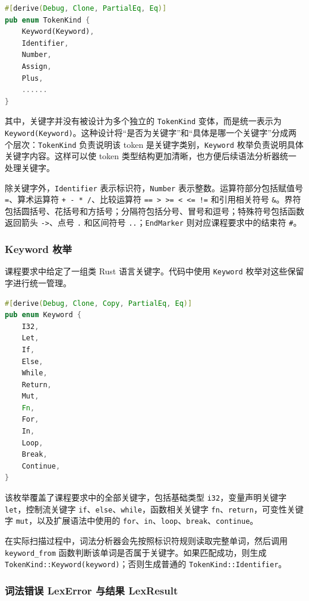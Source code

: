 \documentclass[UTF8,a4paper,12pt]{ctexart}
\begin{document}
\begin{lstlisting}[language=Rust,caption={TokenKind 枚举定义}]
#[derive(Debug, Clone, PartialEq, Eq)]
pub enum TokenKind {
    Keyword(Keyword),
    Identifier,
    Number,
    Assign,
    Plus,
    ......
}
\end{lstlisting}

其中，关键字并没有被设计为多个独立的 \texttt{TokenKind} 变体，而是统一表示为 \texttt{Keyword(Keyword)}。这种设计将“是否为关键字”和“具体是哪一个关键字”分成两个层次：\texttt{TokenKind} 负责说明该 token 是关键字类别，\texttt{Keyword} 枚举负责说明具体关键字内容。这样可以使 token 类型结构更加清晰，也方便后续语法分析器统一处理关键字。

除关键字外，\texttt{Identifier} 表示标识符，\texttt{Number} 表示整数。运算符部分包括赋值号 \texttt{=}、算术运算符 \texttt{+ - * /}、比较运算符 \texttt{== > >= < <= !=} 和引用相关符号 \texttt{\&}。界符包括圆括号、花括号和方括号；分隔符包括分号、冒号和逗号；特殊符号包括函数返回箭头 \texttt{->}、点号 \texttt{.} 和区间符号 \texttt{..}；\texttt{EndMarker} 则对应课程要求中的结束符 \texttt{\#}。

\subsubsection{Keyword 枚举}

课程要求中给定了一组类 Rust 语言关键字。代码中使用 \texttt{Keyword} 枚举对这些保留字进行统一管理。

\begin{lstlisting}[language=Rust,caption={Keyword 枚举定义}]
#[derive(Debug, Clone, Copy, PartialEq, Eq)]
pub enum Keyword {
    I32,
    Let,
    If,
    Else,
    While,
    Return,
    Mut,
    Fn,
    For,
    In,
    Loop,
    Break,
    Continue,
}
\end{lstlisting}

该枚举覆盖了课程要求中的全部关键字，包括基础类型 \texttt{i32}，变量声明关键字 \texttt{let}，控制流关键字 \texttt{if}、\texttt{else}、\texttt{while}，函数相关关键字 \texttt{fn}、\texttt{return}，可变性关键字 \texttt{mut}，以及扩展语法中使用的 \texttt{for}、\texttt{in}、\texttt{loop}、\texttt{break}、\texttt{continue}。

在实际扫描过程中，词法分析器会先按照标识符规则读取完整单词，然后调用 \texttt{keyword\_from} 函数判断该单词是否属于关键字。如果匹配成功，则生成 \texttt{TokenKind::Keyword(keyword)}；否则生成普通的 \texttt{TokenKind::Identifier}。

\subsubsection{词法错误 LexError 与结果 LexResult}
\end{document}

